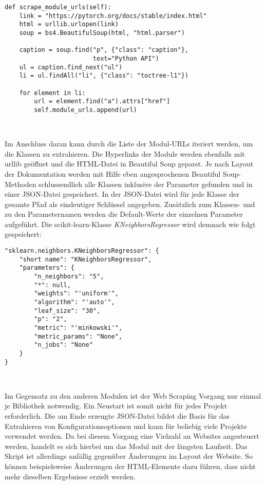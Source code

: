 \documentclass[german,bachelor]{swsLeipzig}
\begin{document}
\noindent\begin{minipage}{\linewidth}
\begin{lstlisting}[language=iPython, frame=single, label=scrape_moduls, basicstyle=\small, caption={Web Scraping der Modul-URLs von PyTorch},captionpos=b]
def scrape_module_urls(self):
    link = "https://pytorch.org/docs/stable/index.html"
    html = urllib.urlopen(link)
    soup = bs4.BeautifulSoup(html, "html.parser")

    caption = soup.find("p", {"class": "caption"},
                        text="Python API")
    ul = caption.find_next("ul")
    li = ul.findAll("li", {"class": "toctree-l1"})

    for element in li:
        url = element.find("a").attrs["href"]
        self.module_urls.append(url)
\end{lstlisting}
\end{minipage}
\

\noindent Im Anschluss daran kann durch die Liste der Modul-URLs iteriert werden, um die Klassen zu extrahieren.
Die Hyperlinks der Module werden ebenfalls mit urllib geöffnet und die HTML-Datei in Beautiful Soup geparst.
Je nach Layout der Dokumentation werden mit Hilfe eben angesprochenen Beautiful Soup-Methoden schlussendlich alle
Klassen inklusive der Parameter gefunden und in einer JSON-Datei gespeichert.
In der JSON-Datei wird für jede Klasse der gesamte Pfad als eindeutiger Schlüssel angegeben.
Zusätzlich zum Klassen- und zu den Parameternamen werden die Default-Werte der einzelnen Parameter aufgeführt.
Die scikit-learn-Klasse \textit{KNeighborsRegressor} wird demnach wie folgt gespeichert:\\

\noindent\begin{minipage}{\linewidth}
\begin{lstlisting}[style=json, frame=single,  label=json_scraping, basicstyle=\small, caption={Web Scraping Ergebnis der KNeighborsRegressor-Klasse aus scikit-learn},captionpos=b]
"sklearn.neighbors.KNeighborsRegressor": {
    "short name": "KNeighborsRegressor",
    "parameters": {
        "n_neighbors": "5",
        "*": null,
        "weights": "'uniform'",
        "algorithm": "'auto'",
        "leaf_size": "30",
        "p": "2",
        "metric": "'minkowski'",
        "metric_params": "None",
        "n_jobs": "None"
    }
}
\end{lstlisting}
\end{minipage}
\

\noindent Im Gegensatz zu den anderen Modulen ist der Web Scraping Vorgang nur einmal je Bibliothek notwendig.
Ein Neustart ist somit nicht für jedes Projekt erforderlich.
Die am Ende erzeugte JSON-Datei bildet die Basis für das Extrahieren von Konfigurationsoptionen und kann für beliebig viele
Projekte verwendet werden.
Da bei diesem Vorgang eine Vielzahl an Websites angesteuert werden, handelt es sich hierbei um das Modul mit der längsten Laufzeit.
Das Skript ist allerdings anfällig gegenüber Änderungen im Layout der Website.
So können beispielsweise Änderungen der HTML-Elemente dazu führen, dass nicht mehr dieselben Ergebnisse erzielt werden. \\
\end{document}
